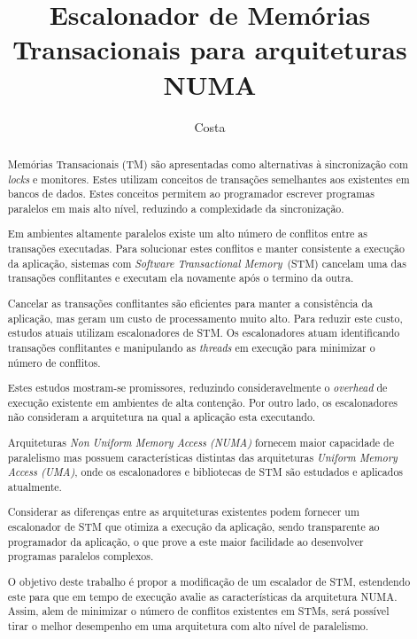 \documentclass[diss-proposta,nocipinfo]{texufpel}
\title{Escalonador de Memórias Transacionais para arquiteturas NUMA}
\author{Costa}{Michael Alexandre}
\begin{document}
\maketitle
\sloppy

\begin{abstract}

  Memórias Transacionais (TM) são apresentadas como alternativas à sincronização com \emph{locks} e monitores. Estes utilizam conceitos de transações semelhantes aos existentes em bancos de dados. Estes conceitos permitem ao programador escrever programas paralelos em mais alto nível, reduzindo a complexidade da sincronização.

  Em ambientes altamente paralelos existe um alto número de conflitos entre as transações executadas. Para solucionar estes conflitos e manter consistente a execução da aplicação, sistemas com \emph{Software Transactional Memory}~(STM) cancelam uma das transações conflitantes e executam ela novamente após o termino da outra.

  Cancelar as transações conflitantes são eficientes para manter a consistência da aplicação, mas geram um custo de processamento muito alto. Para reduzir este custo, estudos atuais utilizam escalonadores de STM. Os escalonadores atuam identificando transações conflitantes e manipulando as \emph{threads} em execução para minimizar o número de conflitos.

  Estes estudos mostram-se promissores, reduzindo consideravelmente o \emph{overhead} de execução existente em ambientes de alta contenção. Por outro lado, os escalonadores não consideram a arquitetura na qual a aplicação esta executando.

  Arquiteturas \emph{Non Uniform Memory Access (NUMA)} fornecem maior capacidade de paralelismo mas possuem características distintas das arquiteturas \emph{Uniform Memory Access (UMA)}, onde os escalonadores e bibliotecas de STM são estudados e aplicados atualmente.

  Considerar as diferenças entre as arquiteturas existentes podem fornecer um escalonador de STM que otimiza a execução da aplicação, sendo transparente ao programador da aplicação, o que prove a este maior facilidade ao desenvolver programas paralelos complexos.

  O objetivo deste trabalho é propor a modificação de um escalador de STM, estendendo este para que em tempo de execução avalie as características da arquitetura NUMA. Assim, alem de minimizar o número de conflitos existentes em STMs, será possível tirar o melhor desempenho em uma arquitetura com alto nível de paralelismo.

\end{abstract}
\end{document}
